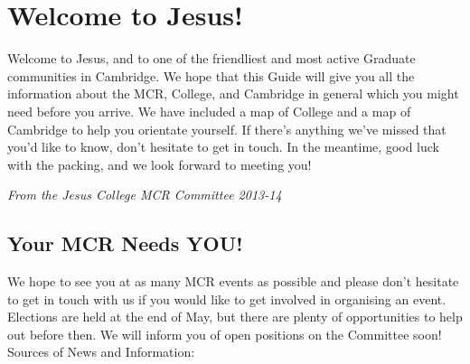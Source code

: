 \documentclass[11pt,fleqn, oneside]{book} %
\begin{document}






\pagestyle{empty} %

\tableofcontents %

\pagestyle{fancy} %



\chapter{Welcome to Jesus!}

Welcome to Jesus, and to one of the friendliest and most active Graduate communities in Cambridge. We hope that this Guide will give you all the information about the MCR, College, and Cambridge in general which you might need before you arrive. We have included a map of College and a map of Cambridge to help you orientate yourself. If there’s anything we’ve missed that you’d like to know, don’t hesitate to get in touch. In the meantime, good luck with the packing, and we look forward to meeting you!
\vspace{0.5cm}


\emph{From the Jesus College MCR Committee 2013-14}

\section{Your MCR Needs YOU!}

We hope to see you at as many MCR events as possible and please don’t hesitate to get in touch with us if you would like to get involved in organising an event. Elections are held at the end of May, but there are plenty of opportunities to help out before then. We will inform you of open positions on the Committee soon!
Sources of News and Information:
\end{document}
